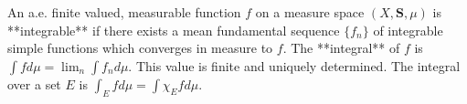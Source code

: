 An a.e. finite valued, measurable function $f$ on a measure space $(X,\mathbf{S},\mu)$ is **integrable** if there exists a mean fundamental sequence $\{f_n\}$ of integrable simple functions which converges in measure to $f$. The **integral** of $f$ is $\int f d\mu = \lim_n \int f_n d\mu$. This value is finite and uniquely determined. The integral over a set $E$ is $\int_E f d\mu = \int \chi_E f d\mu$.
